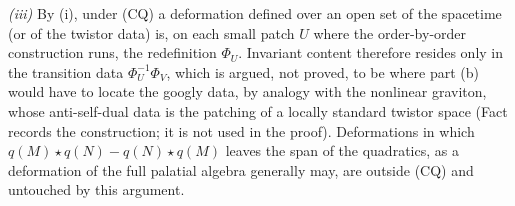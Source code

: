 \emph{(iii)} By (i), under (CQ) a deformation defined over an open set of the spacetime (or of the twistor data) is, on each small patch $U$ where the order-by-order construction runs, the redefinition $\Phi_{U}$. Invariant content therefore resides only in the transition data $\Phi_{U}^{-1}\Phi_{V}$, which is argued, not proved, to be where part (b) would have to locate the googly data, by analogy with the nonlinear graviton, whose anti-self-dual data is the patching of a locally standard twistor space (Fact  records the construction; it is not used in the proof). Deformations in which $q(M)\star q(N) - q(N)\star q(M)$ leaves the span of the quadratics, as a deformation of the full palatial algebra generally may, are outside (CQ) and untouched by this argument.
